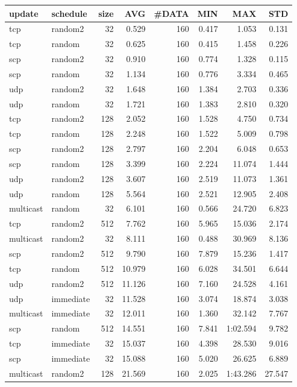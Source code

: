 \begin{tabular}{|llrrrrrr|}
\hline
{\sc update}&{\sc schedule}&{\sc size}&{\sc AVG}&{\sc\#DATA}&{\sc MIN}&{\sc MAX}&{\sc STD}\\
\hline
tcp & random2 & 32 &  0.529 & 160 & 0.417 & 1.053 & 0.131\\
tcp & random & 32 &  0.625 & 160 & 0.415 & 1.458 & 0.226\\
scp & random2 & 32 &  0.910 & 160 & 0.774 & 1.328 & 0.115\\
scp & random & 32 &  1.134 & 160 & 0.776 & 3.334 & 0.465\\
udp & random2 & 32 &  1.648 & 160 & 1.384 & 2.703 & 0.336\\
udp & random & 32 &  1.721 & 160 & 1.383 & 2.810 & 0.320\\
tcp & random2 & 128 &  2.052 & 160 & 1.528 & 4.750 & 0.734\\
tcp & random & 128 &  2.248 & 160 & 1.522 & 5.009 & 0.798\\
scp & random2 & 128 &  2.797 & 160 & 2.204 & 6.048 & 0.653\\
scp & random & 128 &  3.399 & 160 & 2.224 & 11.074 & 1.444\\
udp & random2 & 128 &  3.607 & 160 & 2.519 & 11.073 & 1.361\\
udp & random & 128 &  5.564 & 160 & 2.521 & 12.905 & 2.408\\
multicast & random & 32 &  6.101 & 160 & 0.566 & 24.720 & 6.823\\
tcp & random2 & 512 &  7.762 & 160 & 5.965 & 15.036 & 2.174\\
multicast & random2 & 32 &  8.111 & 160 & 0.488 & 30.969 & 8.136\\
scp & random2 & 512 &  9.790 & 160 & 7.879 & 15.236 & 1.417\\
tcp & random & 512 &  10.979 & 160 & 6.028 & 34.501 & 6.644\\
udp & random2 & 512 &  11.126 & 160 & 7.160 & 24.528 & 4.161\\
udp & immediate & 32 &  11.528 & 160 & 3.074 & 18.874 & 3.038\\
multicast & immediate & 32 &  12.011 & 160 & 1.360 & 32.142 & 7.767\\
scp & random & 512 &  14.551 & 160 & 7.841 & 1:02.594 & 9.782\\
tcp & immediate & 32 &  15.037 & 160 & 4.398 & 28.530 & 9.016\\
scp & immediate & 32 &  15.088 & 160 & 5.020 & 26.625 & 6.889\\
multicast & random2 & 128 &  21.569 & 160 & 2.025 & 1:43.286 & 27.547\\

\end{tabular}
